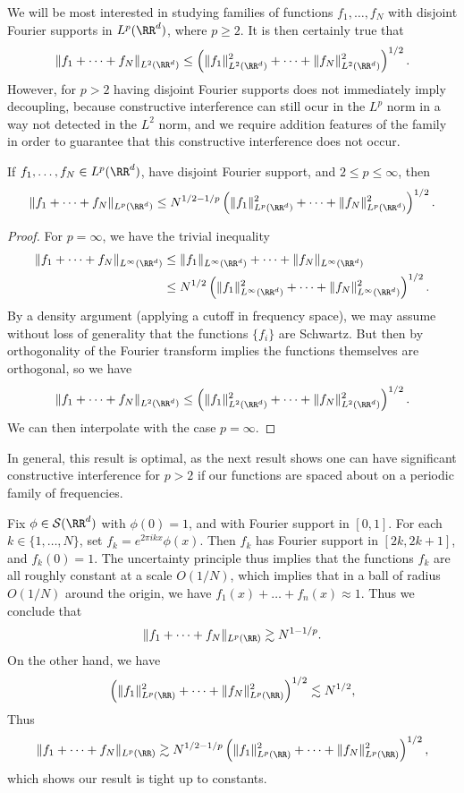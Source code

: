 We will be most interested in studying families of functions $f_1, \dots, f_N$ with disjoint Fourier supports in $L^p(\RR^d)$, where $p \geq 2$. It is then certainly true that
%
\[ \| f_1 + \dots + f_N \|_{L^2(\RR^d)} \leq \left( \| f_1 \|_{L^2(\RR^d)}^2 + \dots + \| f_N \|_{L^2(\RR^d)}^2 \right)^{1/2}. \]
%
However, for $p > 2$ having disjoint Fourier supports does not immediately imply decoupling, because constructive interference can still ocur in the $L^p$ norm in a way not detected in the $L^2$ norm, and we require addition features of the family in order to guarantee that this constructive interference does not occur.

\begin{theorem}
  If $f_1, \dots, f_N \in L^p(\RR^d)$, have disjoint Fourier support, and $2 \leq p \leq \infty$, then
  \[ \| f_1 + \dots + f_N \|_{L^p(\RR^d)} \leq N^{1/2 - 1/p} \left( \| f_1 \|_{L^p(\RR^d)}^2 + \dots + \| f_N \|_{L^p(\RR^d)}^2 \right)^{1/2}. \]
\end{theorem}
\begin{proof}
  For $p = \infty$, we have the trivial inequality
  \begin{align*}
    \| f_1 + \dots + f_N \|_{L^\infty(\RR^d)} &\leq \| f_1 \|_{L^\infty(\RR^d)} + \dots + \| f_N \|_{L^\infty(\RR^d)}\\
    &\leq N^{1/2} \left( \| f_1 \|_{L^\infty(\RR^d)}^2 + \dots + \| f_N \|_{L^\infty(\RR^d)}^2 \right)^{1/2}.
  \end{align*}
  By a density argument (applying a cutoff in frequency space), we may assume without loss of generality that the functions $\{ f_i \}$ are Schwartz. But then by orthogonality of the Fourier transform implies the functions themselves are orthogonal, so we have
  \[ \| f_1 + \dots + f_N \|_{L^2(\RR^d)} \leq \left( \| f_1 \|_{L^2(\RR^d)}^2 + \dots + \| f_N \|_{L^2(\RR^d)}^2 \right)^{1/2}. \]
  We can then interpolate with the case $p = \infty$.
\end{proof}

In general, this result is optimal, as the next result shows one can have significant constructive interference for $p > 2$ if our functions are spaced about on a periodic family of frequencies.

\begin{example}
  Fix $\phi \in \mathcal{S}(\RR^d)$ with $\phi(0) = 1$, and with Fourier support in $[0,1]$. For each $k \in \{ 1, \dots, N \}$, set $f_k = e^{2 \pi i k x} \phi(x)$. Then $f_k$ has Fourier support in $[2k,2k+1]$, and $f_k(0) = 1$. The uncertainty principle thus implies that the functions $f_k$ are all roughly constant at a scale $O(1/N)$, which implies that in a ball of radius $O(1/N)$ around the origin, we have $f_1(x) + \dots + f_n(x) \approx 1$. Thus we conclude that
  \[ \| f_1 + \dots + f_N \|_{L^p(\RR)} \gtrsim N^{1 - 1/p}. \]
  On the other hand, we have
  \[ \left( \| f_1 \|_{L^p(\RR)}^2 + \dots + \| f_N \|_{L^p(\RR)}^2 \right)^{1/2} \lesssim N^{1/2}, \]
  Thus
  \[ \| f_1 + \dots + f_N \|_{L^p(\RR)} \gtrsim N^{1/2 - 1/p} \left( \| f_1 \|_{L^p(\RR)}^2 + \dots + \| f_N \|_{L^p(\RR)}^2 \right)^{1/2}, \]
  which shows our result is tight up to constants.
\end{example}

